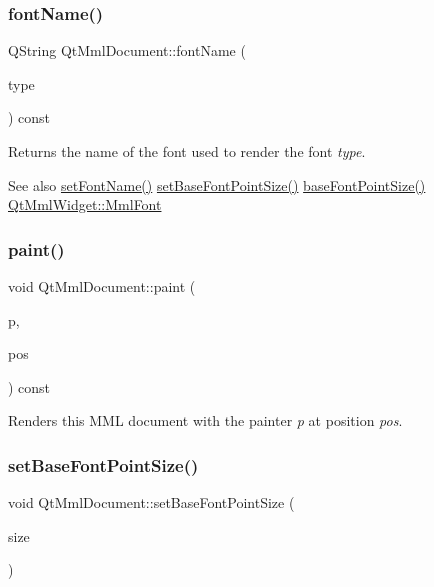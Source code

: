 \subsubsection{\texorpdfstring{font\+Name()}{fontName()}}
{\footnotesize\ttfamily Q\+String Qt\+Mml\+Document\+::font\+Name (\begin{DoxyParamCaption}\item[{\mbox{\hyperlink{class_qt_mml_widget_ac3fde39f7b605557d80bded69f985d2a}{Qt\+Mml\+Widget\+::\+Mml\+Font}}}]{type }\end{DoxyParamCaption}) const}

Returns the name of the font used to render the font {\itshape type}.

\begin{DoxySeeAlso}{See also}
\mbox{\hyperlink{class_qt_mml_document_a6e722bc5c964444616ef4d9e640d9350}{set\+Font\+Name()}} \mbox{\hyperlink{class_qt_mml_document_aedb2bedfbc96f3fb41cd04ecf3f327f2}{set\+Base\+Font\+Point\+Size()}} \mbox{\hyperlink{class_qt_mml_document_a6988266de54f91cdc03e3d20915828c1}{base\+Font\+Point\+Size()}} \mbox{\hyperlink{class_qt_mml_widget_ac3fde39f7b605557d80bded69f985d2a}{Qt\+Mml\+Widget\+::\+Mml\+Font}} 
\end{DoxySeeAlso}
\mbox{\label{class_qt_mml_document_a76b9c85044e6715ff778efd607cc1309}} 
\subsubsection{\texorpdfstring{paint()}{paint()}}
{\footnotesize\ttfamily void Qt\+Mml\+Document\+::paint (\begin{DoxyParamCaption}\item[{Q\+Painter $\ast$}]{p,  }\item[{const Q\+Point \&}]{pos }\end{DoxyParamCaption}) const}

Renders this M\+ML document with the painter {\itshape p} at position {\itshape pos}. \mbox{\label{class_qt_mml_document_aedb2bedfbc96f3fb41cd04ecf3f327f2}} 
\subsubsection{\texorpdfstring{set\+Base\+Font\+Point\+Size()}{setBaseFontPointSize()}}
{\footnotesize\ttfamily void Qt\+Mml\+Document\+::set\+Base\+Font\+Point\+Size (\begin{DoxyParamCaption}\item[{int}]{size }\end{DoxyParamCaption})}

